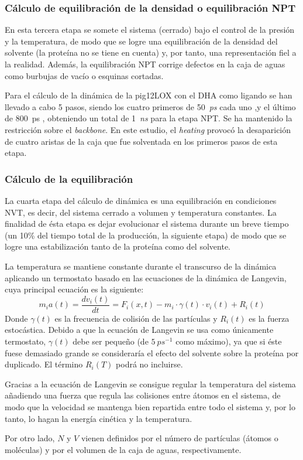         \subsubsection{Cálculo de equilibración de la densidad o equilibración NPT}
            En esta tercera etapa se somete el sistema (cerrado) bajo el control de la presión y la temperatura, de modo que se logre una equilibración de la densidad del solvente (la proteína no se tiene en cuenta) y, por tanto, una representación fiel a la realidad. Además, la equilibración NPT corrige defectos en la caja de aguas como burbujas de vacío o esquinas cortadas. \par
            \textsf{Para el cálculo de la dinámica de la pig12LOX con el DHA como ligando se han llevado a cabo 5 pasos, siendo los cuatro primeros de 50~\textit{ps} cada uno ,y el último de 800~ps , obteniendo un total de 1~\textit{ns} para la etapa NPT. Se ha mantenido la restricción sobre el \textit{backbone}.}
            \textsf{En este estudio, el \textit{heating} provocó la desaparición de cuatro aristas de la caja que fue solventada en los primeros pasos de esta etapa.}
        
        \subsubsection{Cálculo de la equilibración}
            La cuarta etapa del cálculo de dinámica es una equilibración en condiciones NVT, es decir, del sistema cerrado a volumen y temperatura constantes. La finalidad de ésta etapa es dejar evolucionar el sistema durante un breve tiempo (un 10\% del tiempo total de la producción, la siguiente etapa) de modo que se logre una estabilización tanto de la proteína como del solvente.\par
            La temperatura se mantiene constante durante el transcurso de la dinámica aplicando un termostato basado en las ecuaciones de la dinámica de Langevin, cuya principal ecuación es la siguiente:
            $$ m_ia(t) = \frac{d v_i(t)}{d t} = F_i(x,t) - m_i\cdot\gamma(t)\cdot v_i(t) + R_i(t)$$
            \noindent Donde $\gamma(t)$ es la frecuencia de colisión de las partículas y $R_i(t)$ es la fuerza estocástica. Debido a que la ecuación de Langevin se usa como únicamente termostato, $\gamma(t)$ debe ser pequeño (de $5~ps^{-1}$ como máximo), ya que si éste fuese demasiado grande se consideraría el efecto del solvente sobre la proteína por duplicado. El término $R_i(T)$ podrá no incluirse.\par
            Gracias a la ecuación de Langevin se consigue regular la temperatura del sistema añadiendo una fuerza que regula las colisiones entre átomos en el sistema, de modo que la velocidad se mantenga bien repartida entre todo el sistema y, por lo tanto, lo hagan la energía cinética y la temperatura.\par
            Por otro lado, $N$ y $V$ vienen definidos por el número de partículas (átomos o moléculas) y por el volumen de la caja de aguas, respectivamente. \par
            
